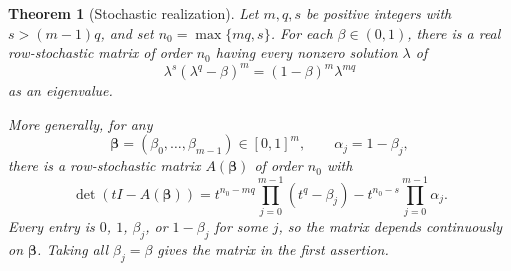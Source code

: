 \documentclass[11pt,a4paper]{article}
\newtheorem{theorem}{Theorem}[section]
\theoremstyle{definition}
\theoremstyle{remark}
\numberwithin{equation}{section}
\begin{document}
\begin{theorem}[Stochastic realization]
\label{thm:sparse-realization}\label{thm:independent-realization}
Let $m,q,s$ be positive integers with $s>(m-1)q$, and set $n_0=\max\{mq,s\}$. For each $\beta\in(0,1)$, there is a real row-stochastic matrix of order $n_0$ having every nonzero solution $\lambda$ of
\begin{equation}\label{eq:realizing-polynomial}
 \lambda^s(\lambda^q-\beta)^m=(1-\beta)^m\lambda^{mq}
\end{equation}
as an eigenvalue.

More generally, for any
\[
 \boldsymbol\beta=(\beta_0,\ldots,\beta_{m-1})\in[0,1]^m,
 \qquad \alpha_j=1-\beta_j,
\]
there is a row-stochastic matrix $A(\boldsymbol\beta)$ of order $n_0$ with
\begin{equation}\label{eq:independent-characteristic}
 \det(tI-A(\boldsymbol\beta))
 =t^{n_0-mq}\prod_{j=0}^{m-1}(t^q-\beta_j)
  -t^{n_0-s}\prod_{j=0}^{m-1}\alpha_j.
\end{equation}
Every entry is $0$, $1$, $\beta_j$, or $1-\beta_j$ for some $j$, so the matrix depends continuously on $\boldsymbol\beta$. Taking all $\beta_j=\beta$ gives the matrix in the first assertion.
\end{theorem}
\end{document}
